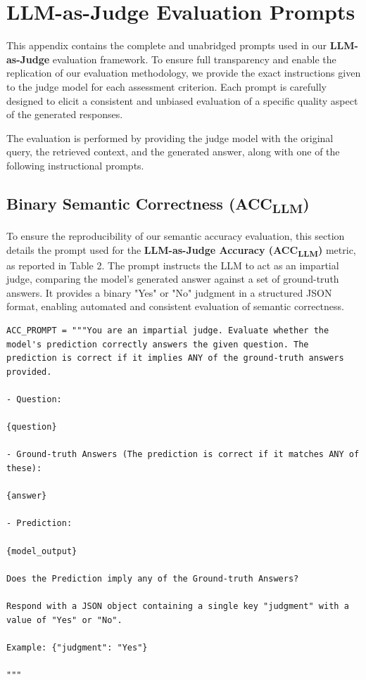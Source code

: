 \documentclass[11pt]{article}
\begin{document}
\section{LLM-as-Judge Evaluation Prompts}
\label{sec:appendix-judge}

This appendix contains the complete and unabridged prompts used in our \textbf{LLM-as-Judge} evaluation framework. To ensure full transparency and enable the replication of our evaluation methodology, we provide the exact instructions given to the judge model for each assessment criterion. Each prompt is carefully designed to elicit a consistent and unbiased evaluation of a specific quality aspect of the generated responses.

The evaluation is performed by providing the judge model with the original query, the retrieved context, and the generated answer, along with one of the following instructional prompts.

\subsection{Binary Semantic Correctness (ACC\textsubscript{LLM})}

To ensure the reproducibility of our semantic accuracy evaluation, this section details the prompt used for the \textbf{LLM-as-Judge Accuracy (ACC\textsubscript{LLM})} metric, as reported in Table 2. The prompt instructs the LLM to act as an impartial judge, comparing the model's generated answer against a set of ground-truth answers. It provides a binary "Yes" or "No" judgment in a structured JSON format, enabling automated and consistent evaluation of semantic correctness.

\begin{lstlisting}[basicstyle=\scriptsize\ttfamily]
ACC_PROMPT = """You are an impartial judge. Evaluate whether the model's prediction correctly answers the given question. The prediction is correct if it implies ANY of the ground-truth answers provided.

- Question:

{question}

- Ground-truth Answers (The prediction is correct if it matches ANY of these):

{answer}

- Prediction:

{model_output}

Does the Prediction imply any of the Ground-truth Answers?

Respond with a JSON object containing a single key "judgment" with a value of "Yes" or "No".

Example: {"judgment": "Yes"}

"""
\end{lstlisting}
\end{document}
